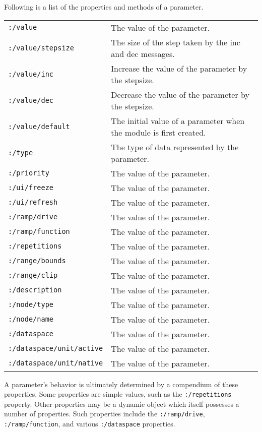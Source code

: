 \documentclass{article}
\begin{document}
Following is a list of the properties and methods of a parameter.
\begin{center} 
{\footnotesize
\begin{tabular}{ll}
	\texttt{:/value} & The value of the parameter. \\
	\texttt{:/value/stepsize} & The size of the step taken by the inc and dec messages. \\
	\texttt{:/value/inc} & Increase the value of the parameter by the stepsize. \\
	\texttt{:/value/dec} & Decrease the value of the parameter by the stepsize. \\
	\texttt{:/value/default} & The initial value of a parameter when the module is first created. \\
	\texttt{:/type} & The type of data represented by the parameter. \\
	\texttt{:/priority} & The value of the parameter. \\
	\texttt{:/ui/freeze} & The value of the parameter. \\
	\texttt{:/ui/refresh} & The value of the parameter. \\
	\texttt{:/ramp/drive} & The value of the parameter. \\
	\texttt{:/ramp/function} & The value of the parameter. \\
	\texttt{:/repetitions} & The value of the parameter. \\
	\texttt{:/range/bounds} & The value of the parameter. \\
	\texttt{:/range/clip} & The value of the parameter. \\
	\texttt{:/description} & The value of the parameter. \\
	\texttt{:/node/type} & The value of the parameter. \\
	\texttt{:/node/name} & The value of the parameter. \\
	\texttt{:/dataspace} & The value of the parameter. \\
	\texttt{:/dataspace/unit/active} & The value of the parameter. \\
	\texttt{:/dataspace/unit/native} & The value of the parameter. \\
\end{tabular} } 
\end{center}  

A parameter's behavior is ultimately determined by a compendium of these properties. Some properties are simple values, such as the \texttt{:/repetitions} property. Other properties may be a dynamic object which itself possesses a number of properties.  Such properties include the \texttt{:/ramp/drive}, \texttt{:/ramp/function}, and various \texttt{:/dataspace} properties.
\end{document}
